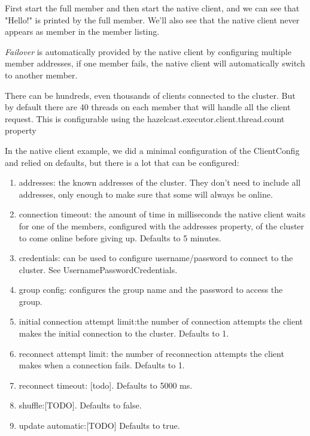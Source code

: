 First start the full member and then start the native client, and we can see that "Hello!" is printed by the full member. We'll also see that the native client never appears as member in the member listing.	
 
\emph{Failover} is automatically provided by the native client by configuring multiple member addresses, if one member fails, the native client will automatically switch to another member.

There can be hundreds, even thousands of clients connected to the cluster. But by default there are 40 threads on each member that will handle all the client request. This is configurable using the hazelcast.executor.client.thread.count property

In the native client example, we did a minimal configuration of the ClientConfig and relied on defaults, but there is a lot that can be configured:
\begin{enumerate}
\item addresses: the known addresses of the cluster. They don't need to include all addresses, only enough to make sure that some will always be online.
\item connection timeout: the amount of time in milliseconds the native client waits for one of the members, configured with the addresses property, of the cluster to come online before giving up. Defaults to 5 minutes.
\item credentials: can be used to configure username/password to connect to the cluster. See UsernamePasswordCredentials.
\item group config: configures the group name and the password to access the group.
\item initial connection attempt limit:the  number of connection attempts the client makes the initial connection to the cluster. Defaults to 1.
\item reconnect attempt limit: the number of reconnection attempts the client makes when a connection fails. Defaults to 1.
\item reconnect timeout: [todo]. Defaults to 5000 ms.
\item shuffle:[TODO]. Defaults to false.
\item update automatic:[TODO] Defaults to true.
\end{enumerate}

